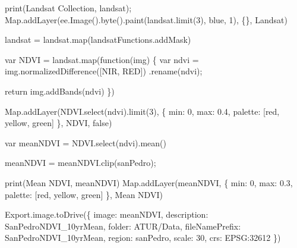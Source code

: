 \documentclass[
]{agujournal2019}
\newenvironment{Shaded}{\begin{snugshade}}{\end{snugshade}}
\newcommand{\NormalTok}[1]{\textcolor[rgb]{0.00,0.23,0.31}{#1}}
\begin{document}
\begin{Shaded}
\begin{Highlighting}[]
\NormalTok{print(\textquotesingle{}Landsat Collection\textquotesingle{}, landsat);}
\NormalTok{Map.addLayer(ee.Image().byte().paint(landsat.limit(3),}
\NormalTok{ \textquotesingle{}blue\textquotesingle{}, 1), \{\}, \textquotesingle{}Landsat\textquotesingle{})}


\NormalTok{landsat = landsat.map(landsatFunctions.addMask)}

\NormalTok{var NDVI = landsat.map(function(img) \{}
\NormalTok{  var ndvi = img.normalizedDifference([\textquotesingle{}NIR\textquotesingle{}, \textquotesingle{}RED\textquotesingle{}])}
\NormalTok{    .rename(\textquotesingle{}ndvi\textquotesingle{});}
  
\NormalTok{  return img.addBands(ndvi)}
\NormalTok{\})}

\NormalTok{Map.addLayer(NDVI.select(\textquotesingle{}ndvi\textquotesingle{}).limit(3), \{}
\NormalTok{  min: 0,}
\NormalTok{  max: 0.4,}
\NormalTok{  palette: [\textquotesingle{}red\textquotesingle{}, \textquotesingle{}yellow\textquotesingle{}, \textquotesingle{}green\textquotesingle{}]}
\NormalTok{\}, \textquotesingle{}NDVI\textquotesingle{}, false)}

\NormalTok{var meanNDVI = NDVI.select(\textquotesingle{}ndvi\textquotesingle{}).mean()}

\NormalTok{meanNDVI = meanNDVI.clip(sanPedro);}

\NormalTok{print(\textquotesingle{}Mean NDVI\textquotesingle{}, meanNDVI)}
\NormalTok{Map.addLayer(meanNDVI, \{}
\NormalTok{  min: 0,}
\NormalTok{  max: 0.3,}
\NormalTok{  palette: [\textquotesingle{}red\textquotesingle{}, \textquotesingle{}yellow\textquotesingle{}, \textquotesingle{}green\textquotesingle{}]}
\NormalTok{\}, \textquotesingle{}Mean NDVI\textquotesingle{})}

\NormalTok{Export.image.toDrive(\{}
\NormalTok{  image: meanNDVI, }
\NormalTok{  description: \textquotesingle{}SanPedroNDVI\_10yrMean\textquotesingle{},}
\NormalTok{  folder: \textquotesingle{}ATUR/Data\textquotesingle{},}
\NormalTok{  fileNamePrefix: \textquotesingle{}SanPedroNDVI\_10yrMean\textquotesingle{},}
\NormalTok{  region: sanPedro,}
\NormalTok{  scale: 30,}
\NormalTok{  crs: \textquotesingle{}EPSG:32612\textquotesingle{}}
\NormalTok{\})}
\end{Highlighting}
\end{Shaded}
\end{document}
